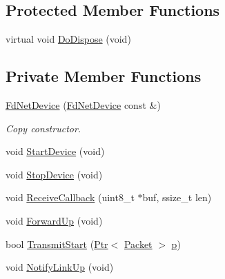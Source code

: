 \subsection*{Protected Member Functions}
\begin{DoxyCompactItemize}
\item 
virtual void \hyperlink{classns3_1_1FdNetDevice_a2ae015e4bc1b4ef3a9f279b3c7dcf5b4}{Do\+Dispose} (void)
\end{DoxyCompactItemize}
\subsection*{Private Member Functions}
\begin{DoxyCompactItemize}
\item 
\hyperlink{classns3_1_1FdNetDevice_a9ca7a80b428788720e22f6bc0f342aab}{Fd\+Net\+Device} (\hyperlink{classns3_1_1FdNetDevice}{Fd\+Net\+Device} const \&)
\begin{DoxyCompactList}\small\item\em Copy constructor. \end{DoxyCompactList}\item 
void \hyperlink{classns3_1_1FdNetDevice_afec16ee9ae009f427348474f9e9c3c50}{Start\+Device} (void)
\item 
void \hyperlink{classns3_1_1FdNetDevice_ae5603448cbdc59550ce805f8c4c786e5}{Stop\+Device} (void)
\item 
void \hyperlink{classns3_1_1FdNetDevice_a65d669a9883c299c5527bbe0b9f33aef}{Receive\+Callback} (uint8\+\_\+t $\ast$buf, ssize\+\_\+t len)
\item 
void \hyperlink{classns3_1_1FdNetDevice_a7fd80498ff2e6f9fd91f0f5db3c5dbd5}{Forward\+Up} (void)
\item 
bool \hyperlink{classns3_1_1FdNetDevice_aaeea471746751f9e33fe79caead4a329}{Transmit\+Start} (\hyperlink{classns3_1_1Ptr}{Ptr}$<$ \hyperlink{classns3_1_1Packet}{Packet} $>$ \hyperlink{lte__link__budget__x2__handover__measures_8m_ac9de518908a968428863f829398a4e62}{p})
\item 
void \hyperlink{classns3_1_1FdNetDevice_a5e53758ee0fae578ad7e759b29193ea8}{Notify\+Link\+Up} (void)
\end{DoxyCompactItemize}
